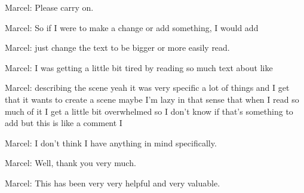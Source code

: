 Marcel: Please carry on.

Marcel: So if I were to make a change or add something, I would add

Marcel: just change the text to be bigger or more easily read.

Marcel: I was getting a little bit tired by reading so much text about like

Marcel: describing the scene yeah it was very specific a lot of things and I get that it wants to create a scene maybe I'm lazy in that sense that when I read so much of it I get a little bit overwhelmed so I don't know if that's something to add but this is like a comment I

Marcel: I don't think I have anything in mind specifically.

Marcel: Well, thank you very much.

Marcel: This has been very very helpful and very valuable.








